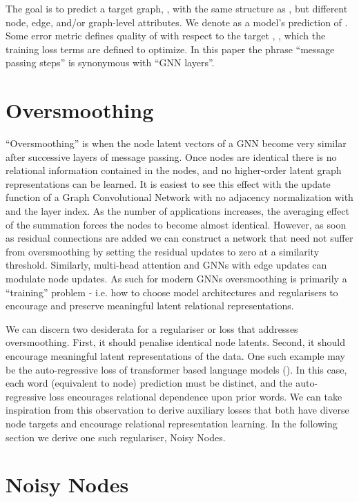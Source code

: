 \documentclass{article} \usepackage{iclr2022_conference,times}
\begin{document}
The goal is to predict a target graph, , with the same structure as , but different node, edge, and/or graph-level attributes. We denote  as a model's prediction of . Some error metric defines quality of  with respect to the target , , which the training loss terms are defined to optimize. In this paper the phrase ``message passing steps'' is synonymous with ``GNN layers''. 

\section{Oversmoothing}

``Oversmoothing'' is when the node latent vectors of a GNN become very similar after successive layers of message passing. Once nodes are identical there is no relational information contained in the nodes, and no higher-order latent graph representations can be learned. It is easiest to see this effect with the update function of a Graph Convolutional Network with no adjacency normalization  with  and  the layer index. As the number of applications increases, the averaging effect of the summation forces the nodes to become almost identical. However, as soon as residual connections are added we can construct a network that need not suffer from oversmoothing by setting the residual updates to zero at a  similarity threshold. Similarly, multi-head attention \cite{Vaswani2017AttentionIA, Velickovic2018graph} and GNNs with edge updates \citep{Battaglia2018RelationalIB, Gilmer2017NeuralMP} can modulate node updates. As such for modern GNNs oversmoothing is primarily a ``training'' problem - i.e. how to choose model architectures and regularisers to encourage and preserve meaningful latent relational representations.

We can discern two desiderata for a regulariser or loss that addresses oversmoothing. First, it should penalise identical node latents. Second, it should encourage meaningful latent representations of the data. One such example may be the auto-regressive loss of transformer based language models (\cite{Brown2020LanguageMA}). In this case, each word (equivalent to node) prediction must be distinct, and the auto-regressive loss encourages relational dependence upon prior words. We can take inspiration from this observation to derive auxiliary losses that both have diverse node targets and encourage relational representation learning. In the following section we derive one such regulariser, Noisy Nodes.


\section{Noisy Nodes}
\end{document}
